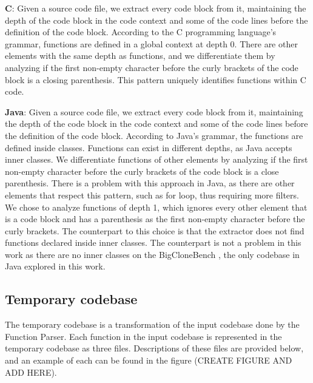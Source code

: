 \begin{itemize}
	\begin{item}
		\textbf{C}: Given a source code file, we extract every code block from it, maintaining the depth 
		of the code block in the code context and some of the code lines before the definition of the 
		code block. According to the C programming language’s grammar, functions are defined in a 
		global context at depth 0. There are other elements with the same depth as functions, and we 
		differentiate them by analyzing if the first non-empty character before the curly brackets of 
		the code block is a closing parenthesis. This pattern uniquely identifies functions 
		within C code.

	\end{item}
	\begin{item}
		\textbf{Java}:  Given a source code file, we extract every code block from it, maintaining the 
		depth of the code block in the code context and some of the code lines before the definition 
		of the code block. According to Java’s grammar, the functions are defined inside classes. 
		Functions can exist in different depths, as Java accepts inner classes. We differentiate 
		functions of other elements by analyzing if the first non-empty character before the curly 
		brackets of the code block is a close parenthesis. There is a problem with this approach in 
		Java, as there are other elements that respect this pattern, such as for loop, thus requiring 
		more filters. We chose to analyze functions of depth 1, which ignores every other element that 
		is a code block and has a parenthesis as the first non-empty character before the curly brackets. 
		The counterpart to this choice is that the extractor does not find functions declared inside 
		inner classes. The counterpart is not a problem in this work as there are no inner classes 
		on the BigCloneBench \citep{bigclonebench}, the only codebase in Java explored in this work.

		
	\end{item}
\end{itemize}

\subsection{Temporary codebase}

The temporary codebase is a transformation of the input codebase done by the Function Parser. 
Each function in the input codebase is represented in the temporary codebase as three files.
Descriptions of these files are provided below, and an example of each can be found in 
the figure (CREATE FIGURE AND ADD HERE).

